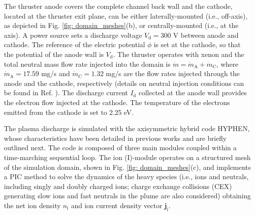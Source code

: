 \documentclass[%
 aip,
cha,
 amsmath,amssymb,
 reprint,%
]{revtex4-1}
\begin{document}
The thruster anode covers the complete channel back wall and the cathode, located at the thruster exit plane, can be either laterally-mounted (i.e., off-axis), as depicted in Fig. \ref{fig: domain_meshes}(b), or centrally-mounted (i.e., at the axis).
%
A power source sets a discharge voltage $V_\mathrm{d} = 300$ V between anode and cathode. The reference of the electric potential $\phi$ is set at the cathode, so that the potential of the anode wall is $V_\mathrm{d}$. 
%
The thruster operates with xenon and the total neutral mass flow rate injected into the domain is $\dot{m} = \dot{m}_\mathrm{A} + \dot{m}_\mathrm{C}$, where $\dot{m}_\mathrm{A} = 17.59$ mg/s and $\dot{m}_\mathrm{C} = 1.32$ mg/s are the flow rates injected through the anode and the cathode, respectively (details on neutral injection conditions can be found in Ref. ).
%
The discharge current $I_\mathrm{d}$ collected at the anode wall provides the electron flow injected at the cathode. The temperature of the electrons emitted from the cathode is set to 2.25 eV.

The plasma discharge is simulated with the axisymmetric hybrid code HYPHEN, whose characteristics have been detailed in previous works \cite{domi19a,zhou21,zhou22a,pera22b} and are briefly outlined next.
%
The code is composed of three main modules coupled within a time-marching sequential loop. The ion (I)-module operates on a structured mesh of the simulation domain, shown in Fig. \ref{fig: domain_meshes}(c), and implements a PIC method to solve the dynamics of the heavy species (i.e., ions and neutrals, including singly and doubly charged ions; charge exchange collisions (CEX) generating slow ions and fast neutrals in the plume are also considered) obtaining the net ion density $n_\mathrm{i}$ and ion current density vector $\bm j_\mathrm{i}$.
%
\end{document}
